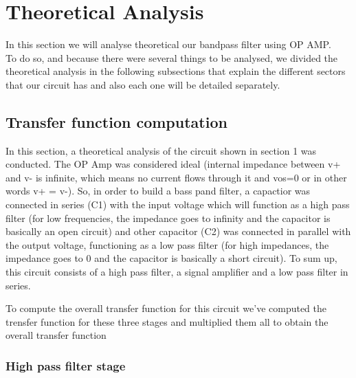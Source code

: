 \section{Theoretical Analysis}
\label{sec:analysis}

In this section we will analyse theoretical our bandpass filter using OP AMP. \\
To do so, and because there were several things to be analysed, we divided the theoretical analysis in the following subsections that explain the different sectors that our circuit has and also each one will be detailed separately.\\

\subsection{Transfer function computation}

In this section, a theoretical analysis of the circuit shown in section 1 was conducted. The OP Amp was considered ideal (internal impedance between v+ and v- is infinite, which means no current flows through it and vos=0 or in other words v+ = v-). So, in order to build a bass pand filter, a capactior was connected in series (C1) with the input voltage which will function as a high pass filter (for low frequencies, the impedance goes to infinity and the capacitor is basically an open circuit)  and other capacitor (C2) was connected in parallel with the output voltage, functioning as a low pass filter (for high impedances, the impedance goes to 0 and the capacitor is basically a short circuit). To sum up, this circuit consists of a high pass filter, a signal amplifier and a low pass filter in series.

To compute the overall transfer function for this circuit we've computed the trensfer function for these three stages and multiplied them all to obtain the overall transfer function

\subsubsection{High pass filter stage}

